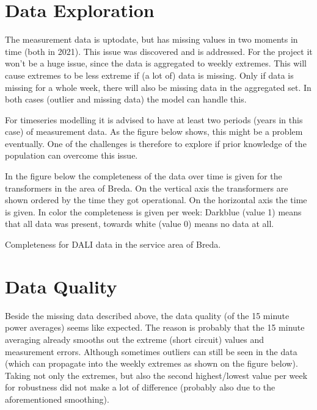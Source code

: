 \documentclass[letterpaper,10pt,english]{sphinxmanual}
\let\sphinxpxdimen\pdfpxdimen\else\newdimen\sphinxpxdimen
\begin{document}
\section{Data Exploration}
\label{\detokenize{data_understanding:data-exploration}}
The measurement data is up\sphinxhyphen{}to\sphinxhyphen{}date, but has missing values in two moments in time (both in 2021). This issue was discovered and is addressed.
For the project it won’t be a huge issue, since the data is aggregated to weekly extremes.
This will cause extremes to be less extreme if (a lot of) data is missing. Only if data is missing for a whole week, there will also be missing data in the aggregated set.
In both cases (outlier and missing data) the model can handle this.

For timeseries modelling it is advised to have at least two periods (years in this case) of measurement data.
As the figure below shows, this might be a problem eventually. One of the challenges is therefore to explore if prior knowledge of the population can overcome this issue.

In the figure below the completeness of the data over time is given for the transformers in the area of Breda.
On the vertical axis the transformers are shown ordered by the time they got operational. On the horizontal axis the time is given. In color the completeness is given per week: Darkblue (value 1) means that all data was present, towards white (value 0) means no data at all.

\noindent{\hspace*{\fill}\sphinxincludegraphics[width=800\sphinxpxdimen]{{dq_completeness}.jpeg}\hspace*{\fill}}

Completeness for DALI data in the service area of Breda.


\section{Data Quality}
\label{\detokenize{data_understanding:data-quality}}
Beside the missing data described above, the data quality (of the 15 minute power averages) seems like expected.
The reason is probably that the 15 minute averaging already smooths out the extreme (short circuit) values and measurement errors. Although sometimes outliers can still be seen in the data (which can propagate into the weekly extremes as shown on the figure below).
Taking not only the extremes, but also the second highest/lowest value per week for robustness did not make a lot of difference (probably also due to the aforementioned smoothing).
\end{document}
